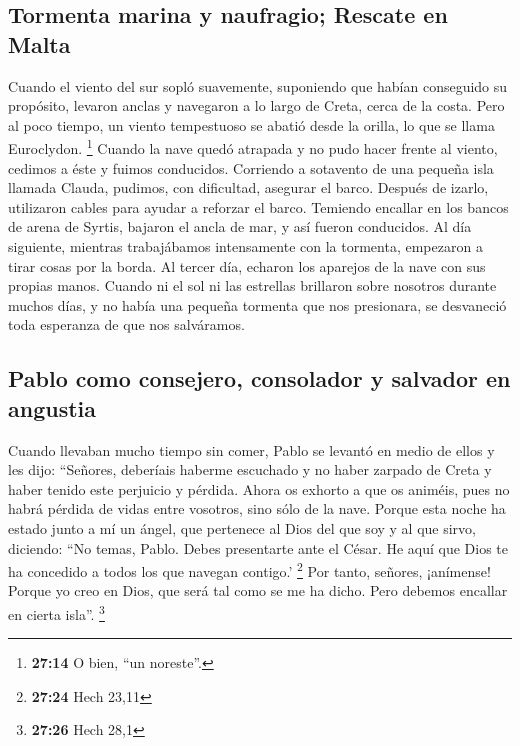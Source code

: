 \hypertarget{tormenta-marina-y-naufragio-rescate-en-malta}{%
\subsection{Tormenta marina y naufragio; Rescate en
Malta}\label{tormenta-marina-y-naufragio-rescate-en-malta}}

 Cuando el viento del sur sopló suavemente, suponiendo
que habían conseguido su propósito, levaron anclas y navegaron a lo
largo de Creta, cerca de la costa.  Pero al poco tiempo,
un viento tempestuoso se abatió desde la orilla, lo que se llama
Euroclydon. \footnote{\textbf{27:14} O bien, ``un noreste''.}
 Cuando la nave quedó atrapada y no pudo hacer frente al
viento, cedimos a éste y fuimos conducidos.  Corriendo a
sotavento de una pequeña isla llamada Clauda, pudimos, con dificultad,
asegurar el barco.  Después de izarlo, utilizaron cables
para ayudar a reforzar el barco. Temiendo encallar en los bancos de
arena de Syrtis, bajaron el ancla de mar, y así fueron conducidos.
 Al día siguiente, mientras trabajábamos intensamente con
la tormenta, empezaron a tirar cosas por la borda.  Al
tercer día, echaron los aparejos de la nave con sus propias manos.
 Cuando ni el sol ni las estrellas brillaron sobre
nosotros durante muchos días, y no había una pequeña tormenta que nos
presionara, se desvaneció toda esperanza de que nos salváramos.

\hypertarget{pablo-como-consejero-consolador-y-salvador-en-angustia}{%
\subsection{Pablo como consejero, consolador y salvador en
angustia}\label{pablo-como-consejero-consolador-y-salvador-en-angustia}}

 Cuando llevaban mucho tiempo sin comer, Pablo se levantó
en medio de ellos y les dijo: ``Señores, deberíais haberme escuchado y
no haber zarpado de Creta y haber tenido este perjuicio y pérdida.
 Ahora os exhorto a que os animéis, pues no habrá pérdida
de vidas entre vosotros, sino sólo de la nave.  Porque
esta noche ha estado junto a mí un ángel, que pertenece al Dios del que
soy y al que sirvo,  diciendo: ``No temas, Pablo. Debes
presentarte ante el César. He aquí que Dios te ha concedido a todos los
que navegan contigo.' \footnote{\textbf{27:24} Hech 23,11}
 Por tanto, señores, ¡anímense! Porque yo creo en Dios,
que será tal como se me ha dicho.  Pero debemos encallar
en cierta isla''. \footnote{\textbf{27:26} Hech 28,1}

